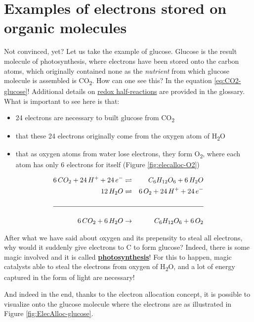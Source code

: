 \documentclass[]{book}
\providecommand{\tightlist}{%
  \setlength{\itemsep}{0pt}\setlength{\parskip}{0pt}}
\theoremstyle{definition}
\theoremstyle{definition}
\theoremstyle{definition}
\theoremstyle{remark}
\begin{document}
\section{Examples of electrons stored on organic
molecules}\label{examples-of-electrons-stored-on-organic-molecules}

Not convinced, yet? Let us take the example of glucose. Glucose is the
result molecule of photosynthesis, where electrons have been stored onto
the carbon atoms, which originally contained none as the \emph{nutrient}
from which glucose molecule is assembled is CO\textsubscript{2}. How can
one see this? In the equation \eqref{eq:CO2-glucose}! Additional details
on \protect\hyperlink{redox}{redox half-reactions} are provided in the
glossary. What is important to see here is that:

\begin{itemize}
\tightlist
\item
  24 electrons are necessary to built glucose from CO\textsubscript{2}
\item
  that these 24 electrons originally come from the oxygen atom of
  H\textsubscript{2}O
\item
  that as oxygen atoms from water lose electrons, they form
  O\textsubscript{2}, where each atom has only 6 electrons for itself
  (Figure \ref{fig:elecalloc-O2})
\end{itemize}

\begin{align}
6\,CO_2 + 24\,H^+ + 24\,e^- & \rightleftharpoons & C_6H_{12}O_6 + 6\,H_2O\\
12\,H_2O & \rightleftharpoons & 6\,O_2 + 24\,H^+ + 24\,e^-\\
& &\\
\hline\\
6\,CO_2 + 6\,H_2O & \to & C_6H_{12}O_6 + 6\,O_2
\label{eq:CO2-glucose}
\end{align}

After what we have said about oxygen and its prepensity to steal all
electrons, why would it suddenly give electrons to C to form glucose?
Indeed, there is some magic involved and it is called
\textbf{\protect\hyperlink{photosynthesis}{photosynthesis}}! For this to
happen, magic catalysts able to steal the electrons from oxygen of
H\textsubscript{2}O, and a lot of energy captured in the form of light
are necessary!

And indeed in the end, thanks to the electron allocation concept, it is
possible to visualize onto the glucose molecule where the electrons are
as illustrated in Figure \ref{fig:ElecAlloc-glucose}.
\end{document}
